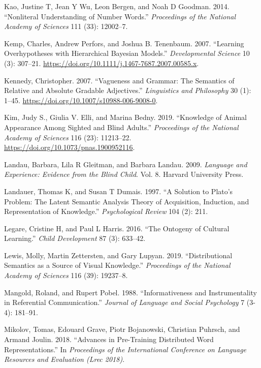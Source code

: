 \documentclass{ucetd}
\newlength{\cslhangindent}
\newenvironment{cslreferences}%
{\setlength{\parindent}{0pt}%
\everypar{\setlength{\hangindent}{\cslhangindent}}\ignorespaces}%
{\par}
\begin{document}
\begin{cslreferences}
\leavevmode\hypertarget{ref-kao2014}{}%
Kao, Justine T, Jean Y Wu, Leon Bergen, and Noah D Goodman. 2014.
``Nonliteral Understanding of Number Words.'' \emph{Proceedings of the
National Academy of Sciences} 111 (33): 12002--7.

\leavevmode\hypertarget{ref-kemp_learning_2007}{}%
Kemp, Charles, Andrew Perfors, and Joshua B. Tenenbaum. 2007. ``Learning
Overhypotheses with Hierarchical Bayesian Models.'' \emph{Developmental
Science} 10 (3): 307--21.
\url{https://doi.org/10.1111/j.1467-7687.2007.00585.x}.

\leavevmode\hypertarget{ref-kennedy_vagueness_2007}{}%
Kennedy, Christopher. 2007. ``Vagueness and Grammar: The Semantics of
Relative and Absolute Gradable Adjectives.'' \emph{Linguistics and
Philosophy} 30 (1): 1--45.
\url{https://doi.org/10.1007/s10988-006-9008-0}.

\leavevmode\hypertarget{ref-kim_knowledge_2019}{}%
Kim, Judy S., Giulia V. Elli, and Marina Bedny. 2019. ``Knowledge of
Animal Appearance Among Sighted and Blind Adults.'' \emph{Proceedings of
the National Academy of Sciences} 116 (23): 11213--22.
\url{https://doi.org/10.1073/pnas.1900952116}.

\leavevmode\hypertarget{ref-landau2009}{}%
Landau, Barbara, Lila R Gleitman, and Barbara Landau. 2009.
\emph{Language and Experience: Evidence from the Blind Child}. Vol. 8.
Harvard University Press.

\leavevmode\hypertarget{ref-landauer1997}{}%
Landauer, Thomas K, and Susan T Dumais. 1997. ``A Solution to Plato's
Problem: The Latent Semantic Analysis Theory of Acquisition, Induction,
and Representation of Knowledge.'' \emph{Psychological Review} 104 (2):
211.

\leavevmode\hypertarget{ref-legare2016}{}%
Legare, Cristine H, and Paul L Harris. 2016. ``The Ontogeny of Cultural
Learning.'' \emph{Child Development} 87 (3): 633--42.

\leavevmode\hypertarget{ref-lewis2019}{}%
Lewis, Molly, Martin Zettersten, and Gary Lupyan. 2019. ``Distributional
Semantics as a Source of Visual Knowledge.'' \emph{Proceedings of the
National Academy of Sciences} 116 (39): 19237--8.

\leavevmode\hypertarget{ref-mangold_informativeness_1988}{}%
Mangold, Roland, and Rupert Pobel. 1988. ``Informativeness and
Instrumentality in Referential Communication.'' \emph{Journal of
Language and Social Psychology} 7 (3-4): 181--91.

\leavevmode\hypertarget{ref-mikolov2018}{}%
Mikolov, Tomas, Edouard Grave, Piotr Bojanowski, Christian Puhrsch, and
Armand Joulin. 2018. ``Advances in Pre-Training Distributed Word
Representations.'' In \emph{Proceedings of the International Conference
on Language Resources and Evaluation (Lrec 2018)}.


\end{cslreferences}
\end{document}
